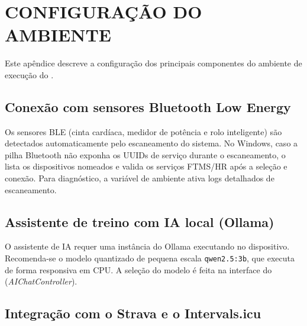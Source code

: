 
\chapter{CONFIGURAÇÃO DO AMBIENTE}
\label{ap:ambiente}

Este apêndice descreve a configuração dos principais componentes do ambiente de
execução do \argus{}.

\section{Conexão com sensores Bluetooth Low Energy}
\label{ap:ambiente-ble}

Os sensores BLE (cinta cardíaca, medidor de potência e rolo inteligente) são
detectados automaticamente pelo escaneamento do sistema. No Windows, caso a
pilha Bluetooth não exponha os UUIDs de serviço durante o escaneamento, o
\argus{} lista os dispositivos nomeados e valida os serviços FTMS/HR após a
seleção e conexão. Para diagnóstico, a variável de ambiente
 ativa logs detalhados de escaneamento.


\section{Assistente de treino com IA local (Ollama)}
\label{ap:ambiente-ollama}

O assistente de IA requer uma instância do Ollama \cite{ollama2024} executando
no dispositivo. Recomenda-se o modelo quantizado de pequena escala
\texttt{qwen2.5:3b}, que executa de forma responsiva em CPU. A seleção do
modelo é feita na interface do \argus{} (\textit{AIChatController}).


\section{Integração com o Strava e o Intervals.icu}
\label{ap:ambiente-strava}

